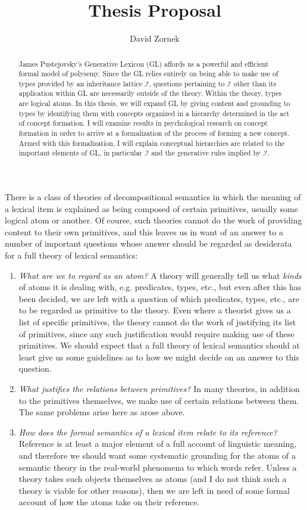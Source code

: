 \documentclass[12pt]{amsart}
\title{Thesis Proposal}
\author{David Zornek}
\date{} %
\begin{document}
\maketitle

\begin{abstract}
James Pustejovsky's Generative Lexicon (GL) affords us a powerful and efficient formal model of polysemy. Since the GL relies entirely on being able to make use of types provided by an inheritance lattice $\mathcal{I}$, questions pertaining to $\mathcal{I}$ other than its application within GL are necessarily outside of the theory. Within the theory, types are logical atoms. In this thesis, we will expand GL by giving content and grounding to types by identifying them with concepts organized in a hierarchy determined in the act of concept formation. I will examine results in psychological research on concept formation in order to arrive at a formalization of the process of forming a new concept. Armed with this formalization, I will explain conceptual hierarchies are related to the important elements of GL, in particular $\mathcal{I}$ and the generative rules implied by $\mathcal{I}$.
\end{abstract}

There is a class of theories of decompositional semantics in which the meaning of a lexical item is explained as being composed of certain primitives, usually some logical atom or another. Of course, such theories cannot do the work of providing content to their own primitives, and this leaves us in want of an answer to a number of important questions whose answer should be regarded as desiderata for a full theory of lexical semantics:
\begin{enumerate}
\item \emph{What are we to regard as an atom?} A theory will generally tell us what \emph{kinds} of atoms it is dealing with, e.g. predicates, types, etc., but even after this has been decided, we are left with a question of which predicates, types, etc., are to be regarded as primitive to the theory. Even where a theorist gives us a list of specific primitives, the theory cannot do the work of justifying its list of primitives, since any such justification would require making use of these primitives. We should expect that a full theory of lexical semantics should at least give us some guidelines as to how we might decide on an answer to this question.
\item \emph{What justifies the relations between primitives?} In many theories, in addition to the primitives themselves, we make use of certain relations between them. The same problems arise here as arose above.
\item \emph{How does the formal semantics of a lexical item relate to its reference?} Reference is at least a major element of a full account of linguistic meaning, and therefore we should want some systematic grounding for the atoms of a semantic theory in the real-world phenomena to which words refer. Unless a theory takes such objects themselves as atoms (and I do not think such a theory is viable for other reasons), then we are left in need of some formal account of how the atoms take on their reference.
\end{enumerate}
\end{document}
